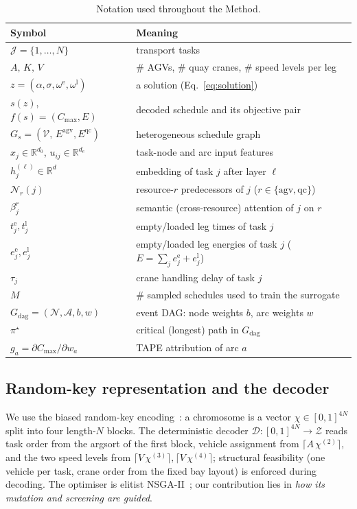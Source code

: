 \documentclass[11pt]{article}
\newcommand{\Cmax}{C_{\max}}
\newcommand{\R}{\mathbb{R}}
\begin{document}
\begin{table}[t]
\centering\small
\caption{Notation used throughout the Method.}
\label{tab:notation}
\begin{tabular}{@{}ll@{}}
\toprule
Symbol & Meaning\\
\midrule
$\mathcal J=\{1,\dots,N\}$ & transport tasks\\
$A,\,K,\,V$ & \# AGVs, \# quay cranes, \# speed levels per leg\\
$z=(\alpha,\sigma,\omega^{\mathrm e},\omega^{\mathrm l})$ & a solution (Eq.~\ref{eq:solution})\\
$s(z)$, $f(s)=(\Cmax,E)$ & decoded schedule and its objective pair\\
$G_s=(\mathcal V,\,E^{\mathrm{agv}},E^{\mathrm{qc}})$ & heterogeneous schedule graph\\
$x_j\in\R^{d_0}$, $u_{ij}\in\R^{d_e}$ & task-node and arc input features\\
$h_j^{(\ell)}\in\R^{d}$ & embedding of task $j$ after layer $\ell$\\
$\mathcal N_r(j)$ & resource-$r$ predecessors of $j$ ($r\in\{\mathrm{agv},\mathrm{qc}\}$)\\
$\beta_j^{r}$ & semantic (cross-resource) attention of $j$ on $r$\\
$t^{\mathrm e}_j,t^{\mathrm l}_j$ & empty/loaded leg times of task $j$\\
$e^{\mathrm e}_j,e^{\mathrm l}_j$ & empty/loaded leg energies of task $j$ ($E=\sum_j e^{\mathrm e}_j+e^{\mathrm l}_j$)\\
$\tau_j$ & crane handling delay of task $j$\\
$M$ & \# sampled schedules used to train the surrogate\\
$G_{\mathrm{dag}}=(\mathcal N,\mathcal A,b,w)$ & event DAG: node weights $b$, arc weights $w$\\
$\pi^\star$ & critical (longest) path in $G_{\mathrm{dag}}$\\
$g_a=\partial\Cmax/\partial w_a$ & TAPE attribution of arc $a$\\
\bottomrule
\end{tabular}
\end{table}

\subsection{Random-key representation and the decoder}
\label{sec:randomkey}
We use the biased random-key encoding~\cite{fontes2022mpbrkga}: a chromosome is a vector
$\chi\in[0,1]^{4N}$ split into four length-$N$ blocks. The deterministic decoder
$\mathcal D:[0,1]^{4N}\!\to\!\mathcal Z$ reads task order from the argsort of the first
block, vehicle assignment from $\lceil A\,\chi^{(2)}\rceil$, and the two speed levels from
$\lceil V\,\chi^{(3)}\rceil,\lceil V\,\chi^{(4)}\rceil$; structural feasibility (one vehicle
per task, crane order from the fixed bay layout) is enforced during decoding. The optimiser
is elitist NSGA-II~\cite{deb2002nsga2}; our contribution lies in \emph{how its mutation and
screening are guided}.
\end{document}
